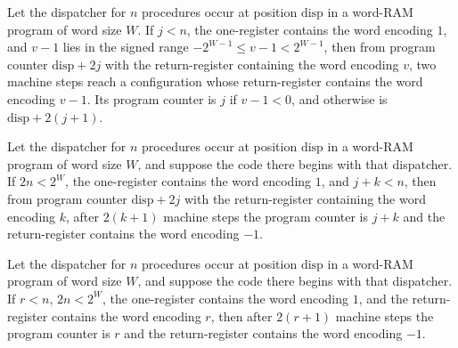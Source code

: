 \begin{theorem}
\label{Light.Compiler.steps_dispatcher_pair}
\leanok
{}
Let the dispatcher for $n$ procedures occur at position $\mathrm{disp}$ in a word-RAM
program of word size $W$. If $j<n$, the one-register contains the word encoding $1$, and
$v-1$ lies in the signed range $-2^{W-1}\le v-1<2^{W-1}$, then from program counter
$\mathrm{disp}+2j$ with the return-register containing the word encoding $v$, two
machine steps reach a configuration whose return-register contains the word encoding
$v-1$. Its program counter is $j$ if $v-1<0$, and otherwise is $\mathrm{disp}+2(j+1)$.
\end{theorem}

\begin{theorem}
\label{Light.Compiler.steps_dispatcher_from}
\leanok
{}
Let the dispatcher for $n$ procedures occur at position $\mathrm{disp}$ in a word-RAM
program of word size $W$, and suppose the code there begins with that dispatcher. If
$2n<2^W$, the one-register contains the word encoding $1$, and $j+k<n$, then from
program counter $\mathrm{disp}+2j$ with the return-register containing the word encoding
$k$, after $2(k+1)$ machine steps the program counter is $j+k$ and the return-register
contains the word encoding $-1$.
\end{theorem}

\begin{theorem}
\label{Light.Compiler.steps_dispatcher}
\leanok
{}
Let the dispatcher for $n$ procedures occur at position $\mathrm{disp}$ in a word-RAM
program of word size $W$, and suppose the code there begins with that dispatcher. If
$r<n$, $2n<2^W$, the one-register contains the word encoding $1$, and the
return-register contains the word encoding $r$, then after $2(r+1)$ machine steps the
program counter is $r$ and the return-register contains the word encoding $-1$.
\end{theorem}
